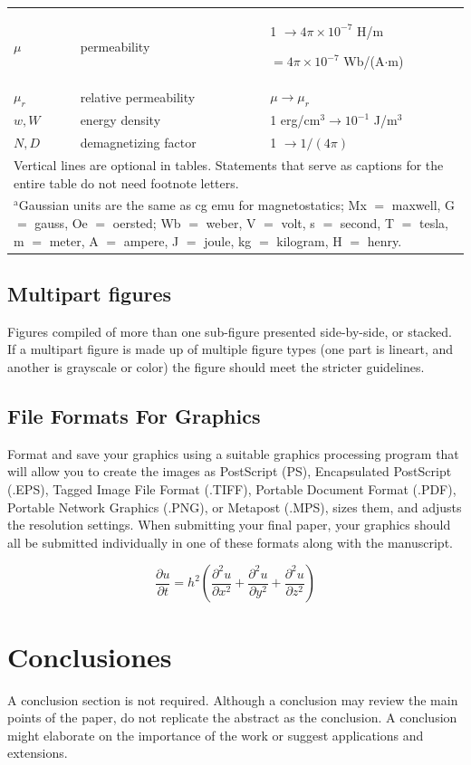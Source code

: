 \documentclass[a4paper]{IEEEtran} %
\begin{document}
\begin{table}
\begin{tabular}{|p{25pt}|p{75pt}|p{115pt}|}
$\mu $& 
permeability& 
1 $\to  4\pi \times  10^{-7}$ H/m \par $= 4\pi \times  10^{-7}$ Wb/(A$\cdot $m) \\
$\mu_{r}$& 
relative permeability& 
$\mu \to \mu_{r}$ \\
$w, W$& 
energy density& 
1 erg/cm$^{3} \to  10^{-1}$ J/m$^{3}$ \\
$N, D$& 
demagnetizing factor& 
1 $\to  1/(4\pi )$ \\
\hline
\multicolumn{3}{p{251pt}}{Vertical lines are optional in tables. Statements that serve as captions for 
the entire table do not need footnote letters. }\\
\multicolumn{3}{p{251pt}}{$^{\mathrm{a}}$Gaussian units are the same as cg emu for magnetostatics; Mx 
$=$ maxwell, G $=$ gauss, Oe $=$ oersted; Wb $=$ weber, V $=$ volt, s $=$ 
second, T $=$ tesla, m $=$ meter, A $=$ ampere, J $=$ joule, kg $=$ 
kilogram, H $=$ henry.}
\end{tabular}
\label{tab1}
\end{table}

\subsection{Multipart figures}
Figures compiled of more than one sub-figure presented side-by-side, or 
stacked. If a multipart figure is made up of multiple figure
types (one part is lineart, and another is grayscale or color) the figure 
should meet the stricter guidelines.

\subsection{File Formats For Graphics}\label{formats}
Format and save your graphics using a suitable graphics processing program 
that will allow you to create the images as PostScript (PS), Encapsulated 
PostScript (.EPS), Tagged Image File Format (.TIFF), Portable Document 
Format (.PDF), Portable Network Graphics (.PNG), or Metapost (.MPS), sizes them, and adjusts 
the resolution settings. When 
submitting your final paper, your graphics should all be submitted 
individually in one of these formats along with the manuscript.

\begin{equation}
\frac{\partial u}{\partial t}
   = h^2 \left( \frac{\partial^2 u}{\partial x^2}
      + \frac{\partial^2 u}{\partial y^2}
      + \frac{\partial^2 u}{\partial z^2} \right)
\end{equation}


\section{Conclusiones}
A conclusion section is not required. Although a conclusion may review the 
main points of the paper, do not replicate the abstract as the conclusion. A 
conclusion might elaborate on the importance of the work or suggest 
applications and extensions. 




\end{document}
